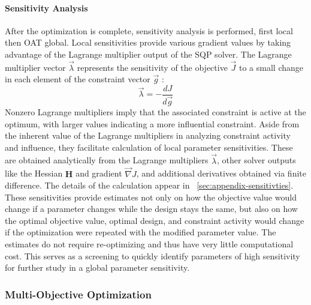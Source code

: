 \paragraph{Sensitivity Analysis}
After the optimization is complete, sensitivity analysis is performed, first local then OAT global.
Local sensitivities provide various gradient values by taking advantage of the Lagrange multiplier output of the SQP solver.
The Lagrange multiplier vector $\vec{\lambda}$ represents the sensitivity of the objective $\vec{J}$ to a small change in each element of the constraint vector $\vec{g}$ \cite{martins_engineering_2022}:
\begin{equation}
    \vec{\lambda} = -\frac{dJ}{d\vec{g}} %
\end{equation}
Nonzero Lagrange multipliers imply that the associated constraint is active at the optimum, with larger values indicating a more influential constraint.
Aside from the inherent value of the Lagrange multipliers in analyzing constraint activity and influence, they facilitate calculation of local parameter sensitivities.
These are obtained analytically from the Lagrange multipliers $\vec{\lambda}$, other solver outputs like the Hessian $\textbf{H}$ and gradient $\vec{\nabla}  J$, and additional derivatives obtained via finite difference.
The details of the calculation appear in \appendixname~\ref{sec:appendix-sensitivties}.
These sensitivities provide estimates not only on how the objective value would change if a parameter changes while the design stays the same, but also on how the optimal objective value, optimal design, and constraint activity would change if the optimization were repeated with the modified parameter value.
The estimates do not require re-optimizing and thus have very little computational cost.
This serves as a screening to quickly identify parameters of high sensitivity for further study in a global parameter sensitivity. 



\subsubsection{Multi-Objective Optimization}\label{sec:multi-obj-process}
